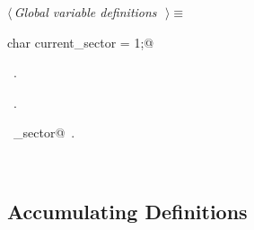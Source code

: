 \documentclass{report}
\begin{document}
\begin{flushleft} \small
\begin{minipage}{\linewidth} \label{scrap37}
$\langle\,${\it Global variable definitions}\nobreak\ {\footnotesize {}}$\,\rangle\equiv$
\vspace{-1ex}
\begin{list}{}{} \item
\mbox{}\verb@unsigned char current_sector = 1;@\\
\mbox{}\verb@@{\NWsep}
\end{list}
\vspace{-1ex}
\footnotesize\addtolength{\baselineskip}{-1ex}
\begin{list}{}{\setlength{\itemsep}{-\parsep}\setlength{\itemindent}{-\leftmargin}}
\item \NWtxtMacroDefBy\ .
\item \NWtxtMacroRefIn\ .
\end{list}
\vspace{-2ex}
\footnotesize\addtolength{\baselineskip}{-1ex}
\begin{list}{}{\setlength{\itemsep}{-\parsep}\setlength{\itemindent}{-\leftmargin}}
\item \NWtxtIdentsUsed\nobreak\  \verb@current_sector@\nobreak\ .\end{list}
\end{minipage}\\[4ex]
\end{flushleft}
\subsection{Accumulating Definitions}
\end{document}
